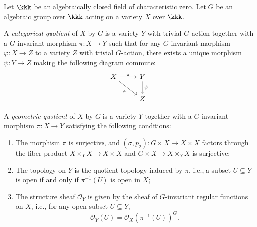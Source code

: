 Let \(\kkk\) be an algebraically closed field of characteristic zero.
    Let \(G\) be an algebraic group over \(\kkk\) acting on a variety \(X\) over \(\kkk\).


    \begin{definition}\label{def:category_quotient}
        A \emph{categorical quotient} of \(X\) by \(G\) is a variety \(Y\) with trivial \(G\)-action together with a \(G\)-invariant morphism \(\pi: X \to Y\)
        such that for any \(G\)-invariant morphism \(\varphi: X \to Z\) to a variety \(Z\) with trivial \(G\)-action,
        there exists a unique morphism \(\psi: Y \to Z\) making the following diagram commute:
        \[
        \begin{tikzcd}
            X \arrow[r, "\pi"] \arrow[rd, "\varphi"'] & Y \arrow[d,gray, "\psi"] \\
            & Z
        \end{tikzcd}
        \]
    \end{definition}


    \begin{definition}\label{def:geometric_quotient}
        A \emph{geometric quotient} of \(X\) by \(G\) is a variety \(Y\) together with a \(G\)-invariant morphism \(\pi: X \to Y\) satisfying the following conditions:
        \begin{enumerate}
            \item The morphism \(\pi\) is surjective, and \((\sigma,p_2):G \times X \to X \times X\) factors through the fiber product \(X \times_Y X \to X \times X\) and \(G \times X \to X \times_Y X\) is surjective;
            \item The topology on \(Y\) is the quotient topology induced by \(\pi\), i.e., a subset \(U \subseteq Y\) is open if and only if \(\pi^{-1}(U)\) is open in \(X\);
            \item The structure sheaf \(\mathcal{O}_Y\) is given by the sheaf of \(G\)-invariant regular functions on \(X\), i.e., for any open subset \(U \subseteq Y\),
            \[
                \mathcal{O}_Y(U) = \mathcal{O}_X(\pi^{-1}(U))^G.
            \]
        \end{enumerate}
    \end{definition}

